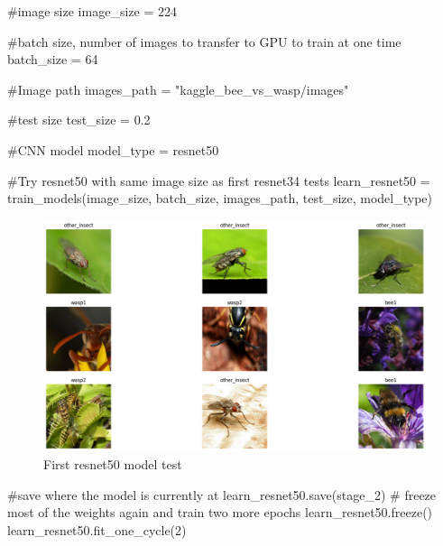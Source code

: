\documentclass[
  letterpaper,
  DIV=11,
  numbers=noendperiod]{scrartcl}
\newenvironment{Shaded}{\begin{snugshade}}{\end{snugshade}}
\newcommand{\CommentTok}[1]{\textcolor[rgb]{0.37,0.37,0.37}{#1}}
\newcommand{\DecValTok}[1]{\textcolor[rgb]{0.68,0.00,0.00}{#1}}
\newcommand{\FloatTok}[1]{\textcolor[rgb]{0.68,0.00,0.00}{#1}}
\newcommand{\NormalTok}[1]{\textcolor[rgb]{0.00,0.23,0.31}{#1}}
\newcommand{\OperatorTok}[1]{\textcolor[rgb]{0.37,0.37,0.37}{#1}}
\newcommand{\StringTok}[1]{\textcolor[rgb]{0.13,0.47,0.30}{#1}}
\begin{document}
\hfill\break

\begin{Shaded}
\begin{Highlighting}[]
\CommentTok{\#image size}
\NormalTok{image\_size }\OperatorTok{=} \DecValTok{224}

\CommentTok{\#batch size, number of images to transfer to GPU to train at one time}
\NormalTok{batch\_size }\OperatorTok{=} \DecValTok{64}

\CommentTok{\#Image path}
\NormalTok{images\_path }\OperatorTok{=} \StringTok{"kaggle\_bee\_vs\_wasp/images"}

\CommentTok{\#test size}
\NormalTok{test\_size }\OperatorTok{=} \FloatTok{0.2}

\CommentTok{\#CNN model}
\NormalTok{model\_type }\OperatorTok{=}\NormalTok{ resnet50}

\CommentTok{\#Try resnet50 with same image size as first resnet34 tests}
\NormalTok{learn\_resnet50 }\OperatorTok{=}\NormalTok{ train\_models(image\_size, batch\_size, images\_path, test\_size, model\_type)}
\end{Highlighting}
\end{Shaded}

\begin{figure}[H]

{\centering \includegraphics{intro-to-ai-fastai_files/figure-latex/fig-firstresnet50-output-1.png}

}

\caption{\label{fig-firstresnet50}First resnet50 model test}

\end{figure}

\hfill\break

\begin{Shaded}
\begin{Highlighting}[]
\CommentTok{\#save where the model is currently at}
\NormalTok{learn\_resnet50.save(}\StringTok{\textquotesingle{}stage\_2\textquotesingle{}}\NormalTok{)}
\CommentTok{\# freeze most of the weights again and train two more epochs}
\NormalTok{learn\_resnet50.freeze()}
\NormalTok{learn\_resnet50.fit\_one\_cycle(}\DecValTok{2}\NormalTok{)}
\end{Highlighting}
\end{Shaded}
\end{document}
